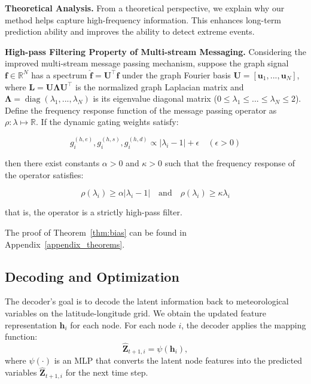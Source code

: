 \textbf{Theoretical Analysis.} From a theoretical perspective, we explain why our method helps capture high-frequency information. This enhances long-term prediction ability and improves the ability to detect extreme events.
\begin{theorem}\label{thm:bias}
\textbf{High-pass Filtering Property of Multi-stream Messaging.} Considering the improved multi-stream message passing mechanism, suppose the graph signal $\bm{f} \in \mathbb{R}^N$ has a spectrum $\hat{\bm{f}} = \bm{U}^\top \bm{f}$ under the graph Fourier basis $\bm{U} = [\bm{u}_1, ..., \bm{u}_N]$, where $\bm{L} = \bm{U} \bm{\Lambda} \bm{U}^\top$ is the normalized graph Laplacian matrix and $\bm{\Lambda} = \operatorname{diag}(\lambda_1, ..., \lambda_N)$ is its eigenvalue diagonal matrix ($0 \leq \lambda_1 \leq ... \leq \lambda_N \leq 2$). Define the frequency response function of the message passing operator as $\rho: \lambda \mapsto \mathbb{R}$. If the dynamic gating weights satisfy:

\begin{equation}
    g^{(h,e)}_i, g^{(h,s)}_i, g^{(h,d)}_i \propto |\lambda_i - 1| + \epsilon \quad (\epsilon > 0)
\end{equation}

then there exist constants $\alpha > 0$ and $\kappa > 0$ such that the frequency response of the operator satisfies:

\begin{equation}
    \rho(\lambda_i) \geq \alpha |\lambda_i - 1| \quad \text{and} \quad \rho(\lambda_i) \geq \kappa \lambda_i
\end{equation}

that is, the operator is a strictly high-pass filter.
\end{theorem}
The proof of Theorem~\ref{thm:bias} can be found in Appendix~\ref{appendix_theorems}.
\subsection{Decoding and Optimization}
The decoder's goal is to decode the latent information back to meteorological variables on the latitude-longitude grid. We obtain the updated feature representation $\mathbf{h}_i$ for each node. For each node $i$, the decoder applies the mapping function:
\begin{equation}
\hat{\mathbf{Z}}_{t+1, i} = \psi(\mathbf{h}_i),
\end{equation}
where $\psi(\cdot)$ is an MLP that converts the latent node features into the predicted variables $\hat{\mathbf{Z}}_{t+1, i}$ for the next time step.

